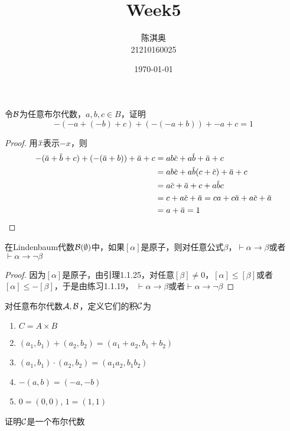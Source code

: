 \documentclass[11pt]{article}
\author{陈淇奥\\21210160025}
\date{\today}
\title{Week5}
\begin{document}
\maketitle
\begin{exercise}
令\(\mathcal{B}\)为任意布尔代数，\(a,b,c\in B\)，证明
\begin{equation*}
-(-a+(-b)+c)+(-(-a+b))+-a+c=1
\end{equation*}
\end{exercise}

\begin{proof}
用\(\barx\)表示\(-x\)，则
\begin{align*}
-(\bara+\barb+c)+(-(\bara+b))+\bara+c&=ab\barc+a\barb+\bara+c\\
&=ab\barc+a\barb(c+\barc)+\bara+c\\
&=a\barc+\bara+c+a\barb c\\
&=c+a\barc+\bara=ca+c\bara+a\barc+\bara\\
&=a+\bara=1
\end{align*}
\end{proof}

\begin{exercise}
在Lindenbaum代数\(\mathcal{B}(\emptyset)\)中，如果\([\alpha]\)是原子，则对任意公式\(\beta\)，\(\vdash\alpha\to\beta\)或者\(\vdash\alpha\to\neg\beta\)
\end{exercise}

\begin{proof}
因为\([\alpha]\)是原子，由引理1.1.25，对任意\([\beta]\neq 0\)，\([\alpha]\le[\beta]\)或者\([\alpha]\le-[\beta]\)，于是由练习1.1.19，
\(\vdash\alpha\to\beta\)或者\(\vdash\alpha\to\neg\beta\)
\end{proof}

\begin{exercise}
对任意布尔代数\(\mathcal{A},\mathcal{B}\)，定义它们的积\(\mathcal{C}\)为
\begin{enumerate}
\item \(C=A\times B\)
\item \((a_1,b_1)+(a_2,b_2)=(a_1+a_2,b_1+b_2)\)
\item \((a_1,b_1)\cdot(a_2,b_2)=(a_1a_2,b_1b_2)\)
\item \(-(a,b)=(-a,-b)\)
\item \(0=(0,0)\), \(1=(1,1)\)
\end{enumerate}


证明\(\mathcal{C}\)是一个布尔代数
\end{exercise}
\end{document}
